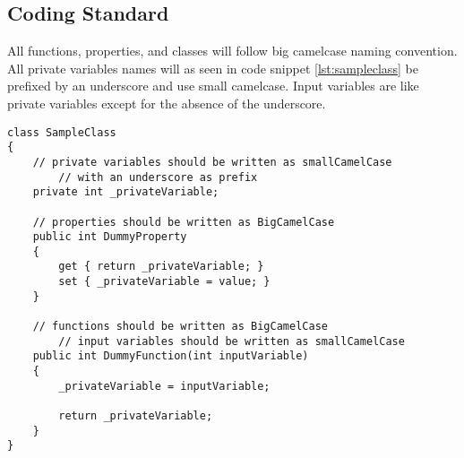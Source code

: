 \subsection{Coding Standard}
\label{subsec:coding_standard}
All functions, properties, and classes will follow big camelcase naming convention.
All private variables names will as seen in code snippet \ref{lst:sampleclass} be prefixed by an underscore and use small camelcase.
Input variables are like private variables except for the absence of the underscore.

\begin{lstlisting}[style=sourceCode, caption=\myCaption{SampleClass.cs}, label=lst:sampleclass]
class SampleClass
{
    // private variables should be written as smallCamelCase
		// with an underscore as prefix
    private int _privateVariable;

    // properties should be written as BigCamelCase
    public int DummyProperty
    {
        get { return _privateVariable; }
        set { _privateVariable = value; }
    }

    // functions should be written as BigCamelCase
		// input variables should be written as smallCamelCase
    public int DummyFunction(int inputVariable)
    {
        _privateVariable = inputVariable;

        return _privateVariable;
    }
}
\end{lstlisting}